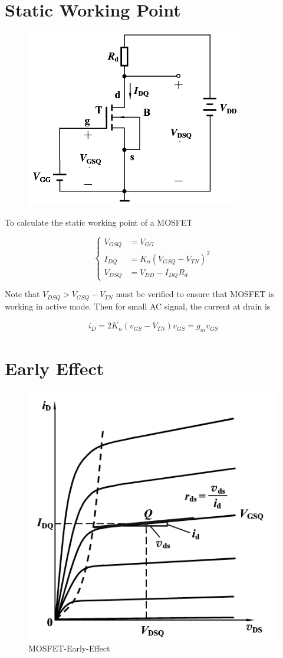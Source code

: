 \section{Static Working Point}

\begin{figure}[H]
  \centering
  \includegraphics[width=0.5\linewidth]{figures/MOSFET-Static}
  \label{fig:}
\end{figure}

To calculate the static working point of a MOSFET

\begin{equation*}
  \left\{
  \begin{aligned}
    V_{GSQ} &= V_{GG} \\
    I_{DQ} &= K_n \left( V_{GSQ} - V_{TN} \right)^2 \\
    V_{DSQ} &= V_{DD} - I_{DQ} R_d
  \end{aligned}
  \right.
\end{equation*}

Note that $V_{DSQ} > V_{GSQ} - V_{TN}$ must be verified to ensure that MOSFET is working in active mode. Then for small AC signal, the current at drain is

\begin{equation*}
  \begin{aligned}
    i_D = 2 K_n \left( v_{GS} - V_{TN} \right) v_{GS} = g_m v_{GS}
  \end{aligned}
\end{equation*}

\section{Early Effect}

\begin{figure}[H]
  \centering
  \includegraphics[width=0.3\linewidth]{figures/MOSFET-Early-Effect}
  \caption{MOSFET-Early-Effect}
  \label{fig:}
\end{figure}

